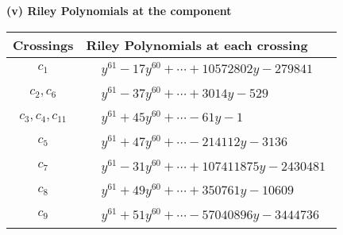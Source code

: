 \documentclass[1p]{elsarticle_modified}
\theoremstyle{definition}
\begin{document}
\newpage\renewcommand{\arraystretch}{1}
\flushleft \textbf{(v) Riley Polynomials at the component}\newline \\
\begin{tabular}{m{50pt}|m{274pt}}
Crossings & \hspace{64pt}Riley Polynomials at each crossing \\
\hline $$\begin{aligned}c_{1}\end{aligned}$$&$\begin{aligned}
&y^{61}-17 y^{60}+\cdots+10572802 y-279841
\end{aligned}$\\
\hline $$\begin{aligned}c_{2},c_{6}\end{aligned}$$&$\begin{aligned}
&y^{61}-37 y^{60}+\cdots+3014 y-529
\end{aligned}$\\
\hline $$\begin{aligned}c_{3},c_{4},c_{11}\end{aligned}$$&$\begin{aligned}
&y^{61}+45 y^{60}+\cdots-61 y-1
\end{aligned}$\\
\hline $$\begin{aligned}c_{5}\end{aligned}$$&$\begin{aligned}
&y^{61}+47 y^{60}+\cdots-214112 y-3136
\end{aligned}$\\
\hline $$\begin{aligned}c_{7}\end{aligned}$$&$\begin{aligned}
&y^{61}-31 y^{60}+\cdots+107411875 y-2430481
\end{aligned}$\\
\hline $$\begin{aligned}c_{8}\end{aligned}$$&$\begin{aligned}
&y^{61}+49 y^{60}+\cdots+350761 y-10609
\end{aligned}$\\
\hline $$\begin{aligned}c_{9}\end{aligned}$$&$\begin{aligned}
&y^{61}+51 y^{60}+\cdots-57040896 y-3444736
\end{aligned}$\\

\end{tabular}
\end{document}
